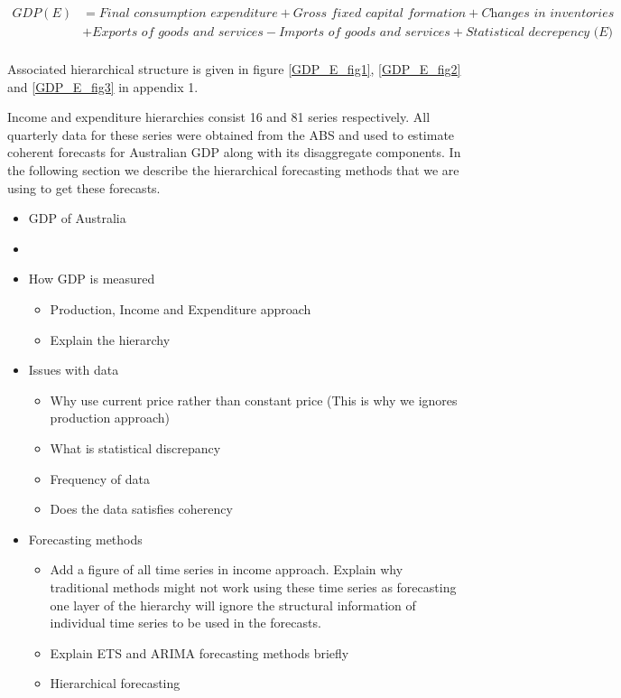 \documentclass[graybox]{svmult}
\begin{document}
\begin{small}
	\begin{align*}
	GDP(E) &= \textit{Final consumption expenditure} + \textit{Gross fixed capital formation} + \textit{Changes in inventories}\\ &+ \textit{Exports of goods and services} - \textit{Imports of goods and services} + \textit{Statistical decrepency (E)}\\
	\end{align*}
\end{small}
Associated hierarchical structure is given in figure \ref{GDP_E_fig1}, \ref{GDP_E_fig2} and \ref{GDP_E_fig3} in appendix 1.

Income and expenditure hierarchies consist 16 and 81 series respectively. All quarterly data for these series were obtained from the ABS and used to estimate coherent forecasts for Australian GDP along with its disaggregate components. In the following section we describe the hierarchical forecasting methods that we are using to get these forecasts.

\begin{itemize}
	\item GDP of Australia
	\item []
	\item How GDP is measured
	\begin{itemize}
		\item Production, Income and Expenditure approach
		\item Explain the hierarchy
	\end{itemize}
	\item Issues with data
	\begin{itemize}
		\item Why use current price rather than constant price (This is why we ignores production approach)
		\item What is statistical discrepancy
		\item Frequency of data
		\item Does the data satisfies coherency
	\end{itemize}
	
	\item Forecasting methods
	\begin{itemize}
		\item Add a figure of all time series in income approach.
		Explain why traditional methods might not work using these time series as forecasting one layer of the hierarchy will ignore the structural information of individual time series to be used in the forecasts.
		
		\item Explain ETS and ARIMA forecasting methods briefly
		\item Hierarchical forecasting
	\end{itemize}
\end{itemize}
\end{document}
